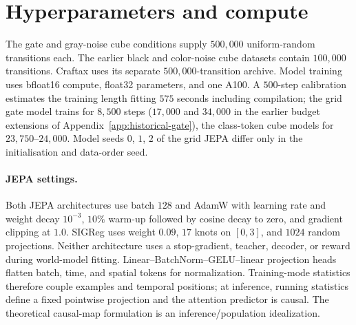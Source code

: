 \begin{table}[ht]
\centering
\caption{Survival (percent) in the supplementary cube worlds. ``LeWM'' denotes the class-token JEPA;
``grid'' denotes the grid JEPA; ``goal'' and ``heads'' use latent-goal and learned-return search,
respectively. PPO columns use the final saved policies; ``px'' and ``z'' identify pixel and latent
observations. Still-world survival does not certify state feedback.}
\label{tab:cube}
\end{table}

\clearpage
\section{Hyperparameters and compute}
\label{app:hparams}

The gate and gray-noise cube conditions supply $500{,}000$ uniform-random transitions each. The earlier black and color-noise cube datasets contain $100{,}000$ transitions. Craftax uses its separate $500{,}000$-transition archive. Model training uses bfloat16 compute,
float32 parameters, and one A100. A $500$-step calibration estimates the training length fitting
$575$ seconds including compilation; the grid gate model trains for $8{,}500$ steps ($17{,}000$ and $34{,}000$ in the earlier budget extensions of Appendix~\ref{app:historical-gate}), the class-token cube models for $23{,}750$--$24{,}000$.
Model seeds $0$, $1$, $2$ of the grid JEPA differ only in the initialisation and data-order seed.

\paragraph{JEPA settings.}
Both JEPA architectures use batch $128$ and AdamW with learning rate and weight decay $10^{-3}$, $10\%$ warm-up
followed by cosine decay to zero, and gradient clipping at $1.0$. SIGReg uses weight $0.09$, $17$
knots on $[0,3]$, and $1024$ random projections. Neither architecture uses a stop-gradient, teacher, decoder, or
reward during world-model fitting. Linear--BatchNorm--GELU--linear projection heads flatten batch, time, and spatial tokens for normalization. Training-mode statistics therefore couple examples and temporal positions; at inference, running statistics define a fixed pointwise projection and the attention predictor is causal. The theoretical causal-map formulation is an inference/population idealization.

